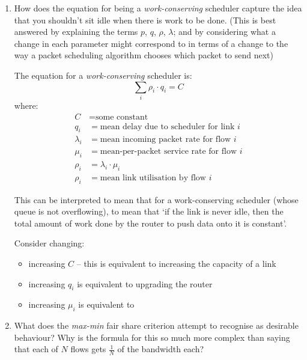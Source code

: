 \documentclass[10pt,\jkfside,a4paper]{article}
\newcommand{\wcs}{\textit{work-conserving}\xspace}
\newcommand{\mm}{\textit{max-min}\xspace}
\begin{document}
\begin{enumerate}

    \item How does the equation for being a \wcs scheduler capture the idea that you shouldn't sit idle when there is work to be done. (This is best answered by explaining the terms $p$, $q$, $\rho$, $\lambda$; and by considering what a change in each parameter might correspond to in terms of a change to the way a packet scheduling algorithm chooses which packet to send next)

    The equation for a \wcs scheduler is:
    \[
        \sum_i \rho_i \cdot q_i = C
    \]
    where:
    \begin{align*}
        C &= \text{some constant} \\
        q_i &= \text{mean delay due to scheduler for link $i$} \\
        \lambda_i &= \text{mean incoming packet rate for flow $i$} \\
        \mu_i &= \text{mean-per-packet service rate for flow $i$} \\
        \rho_i &= \lambda_i \cdot \mu_i \\
        \rho_i &= \text{mean link utilisation by flow $i$}
    \end{align*}

    This can be interpreted to mean that for a work-conserving scheduler (whose queue is not overflowing), to mean that `if the link is never idle, then the total amount of work done by the router to push data onto it is constant'.

    Consider changing:
    \begin{itemize}

        \item increasing $C$ -- this is equivalent to increasing the capacity of a link

        \item increasing $q_i$ is equivalent to upgrading the router

        \item increasing $\mu_i$ is equivalent to

    \end{itemize}


    \item What does the \mm fair share criterion attempt to recognise as desirable behaviour? Why is the formula for this so much more complex than saying that each of $N$ flows gets $\frac{1}{N}$ of the bandwidth each?


\end{enumerate}
\end{document}
